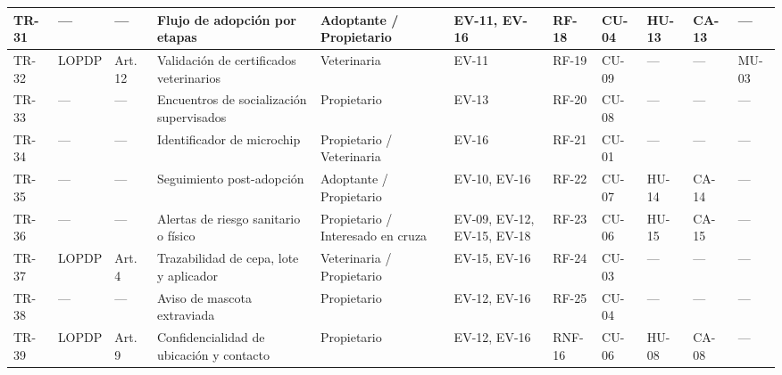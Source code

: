 \documentclass[journal,onecolumn]{IEEEtran}
\begin{document}
\begin{landscape}
\begin{longtable}{@{}p{0.8cm} p{1.3cm} p{1.5cm} p{2.2cm} p{1.5cm} p{1.8cm} p{1.6cm} p{1.3cm} p{1.3cm} p{1.3cm} p{1.5cm}@{}}
			TR-31 & --- & --- & Flujo de adopción por etapas & Adoptante / Propietario & EV-11, EV-16 & RF-18 & CU-04 & HU-13 & CA-13 & --- \\ \midrule
			
			TR-32 & LOPDP & Art. 12 & Validación de certificados veterinarios & Veterinaria & EV-11 & RF-19 & CU-09 & --- & --- & MU-03 \\ \midrule
			
			TR-33 & --- & --- & Encuentros de socialización supervisados & Propietario & EV-13 & RF-20 & CU-08 & --- & --- & --- \\ \midrule
			
			TR-34 & --- & --- & Identificador de microchip & Propietario / Veterinaria & EV-16 & RF-21 & CU-01 & --- & --- & --- \\ \midrule
			
			TR-35 & --- & --- & Seguimiento post-adopción & Adoptante / Propietario & EV-10, EV-16 & RF-22 & CU-07 & HU-14 & CA-14 & --- \\ \midrule
			
			TR-36 & --- & --- & Alertas de riesgo sanitario o físico & Propietario / Interesado en cruza & EV-09, EV-12, EV-15, EV-18 & RF-23 & CU-06 & HU-15 & CA-15 & --- \\ \midrule
			
			TR-37 & LOPDP & Art. 4 & Trazabilidad de cepa, lote y aplicador & Veterinaria / Propietario & EV-15, EV-16 & RF-24 & CU-03 & --- & --- & --- \\ \midrule
			
			TR-38 & --- & --- & Aviso de mascota extraviada & Propietario & EV-12, EV-16 & RF-25 & CU-04 & --- & --- & --- \\ \midrule
			
			TR-39 & LOPDP & Art. 9 & Confidencialidad de ubicación y contacto & Propietario & EV-12, EV-16 & RNF-16 & CU-06 & HU-08 & CA-08 & --- \\ \midrule
			

\end{longtable}
\end{landscape}
\end{document}
